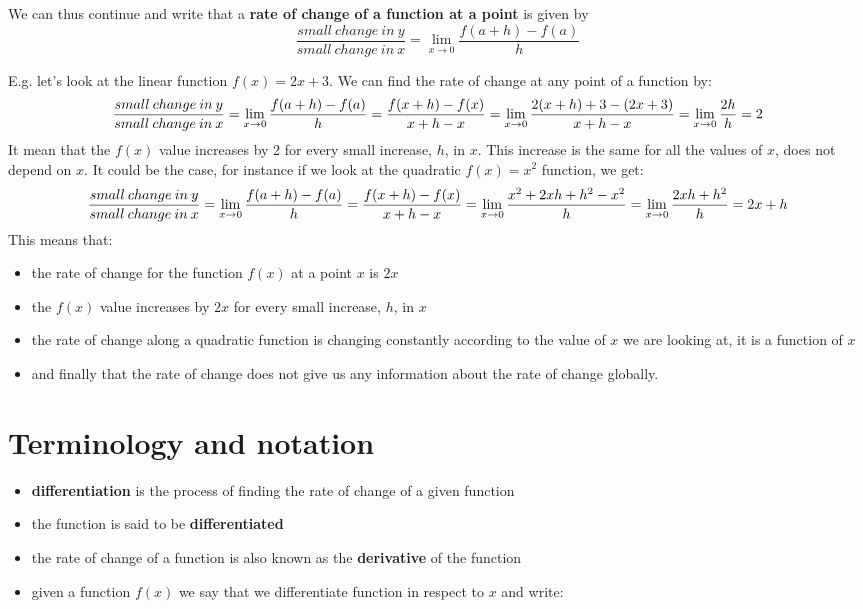 \documentclass[
]{book}
\providecommand{\tightlist}{%
  \setlength{\itemsep}{0pt}\setlength{\parskip}{0pt}}
\theoremstyle{definition}
\theoremstyle{definition}
\theoremstyle{definition}
\theoremstyle{remark}
\begin{document}
We can thus continue and write that a \textbf{rate of change of a function at a point} is given by
\begin{equation}
\frac{small\:change\:in\:y}{small\:change\:in\:x} = \lim_{x\to0}\frac{f(a+h)-f(a)}{h}
\label{eq:diff-point}
\end{equation}

E.g. let's look at the linear function \(f(x) = 2x+3\). We can find the rate of change at any point of a function by:
\[\frac{small\:change\:in\:y}{small\:change\:in\:x} = \lim_{x\to0}\frac{f(a+h)-f(a)}{h} = \\\frac{f(x+h)-f(x)}{x+h-x}= \lim_{x\to0}\frac{2(x+h)+3-(2x+3)}{x+h-x}=\lim_{x\to0}\frac{2h}{h}=2\]
It mean that the \(f(x)\) value increases by 2 for every small increase, \(h\), in \(x\). This increase is the same for all the values of \(x\), does not depend on \(x\). It could be the case, for instance if we look at the quadratic \(f(x)=x^2\) function, we get:
\[\frac{small\:change\:in\:y}{small\:change\:in\:x} = \lim_{x\to0}\frac{f(a+h)-f(a)}{h} =\\ \frac{f(x+h)-f(x)}{x+h-x}=\lim_{x\to0}\frac{x^2+2xh+h^2-x^2}{h}=\lim_{x\to0}\frac{2xh+h^2}{h}=2x+h\]
This means that:

\begin{itemize}
\tightlist
\item
  the rate of change for the function \(f(x)\) at a point \(x\) is \(2x\)
\item
  the \(f(x)\) value increases by \(2x\) for every small increase, \(h\), in \(x\)
\item
  the rate of change along a quadratic function is changing constantly according to the value of \(x\) we are looking at, it is a function of \(x\)
\item
  and finally that the rate of change does not give us any information about the rate of change globally.
\end{itemize}

\hypertarget{terminology-and-notation}{%
\section{Terminology and notation}\label{terminology-and-notation}}

\begin{itemize}
\tightlist
\item
  \textbf{differentiation} is the process of finding the rate of change of a given function
\item
  the function is said to be \textbf{differentiated}
\item
  the rate of change of a function is also known as the \textbf{derivative} of the function
\item
  given a function \(f(x)\) we say that we differentiate function in respect to \(x\) and write:
\end{itemize}
\end{document}
